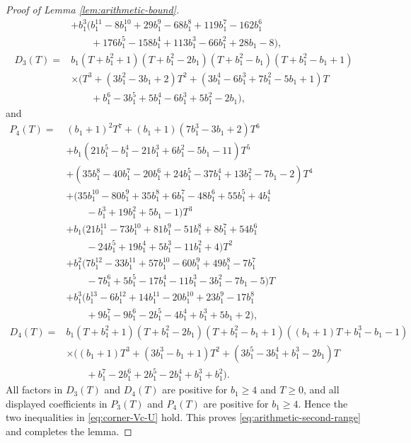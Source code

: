 \documentclass[10pt,a4paper]{amsart}
\begin{document}
\begin{proof}[Proof of Lemma \ref{lem:arithmetic-bound}]
\begin{align*}
        &+b_1^3(b_1^{11}-8b_1^{10}+29b_1^9-68b_1^8+119b_1^7-162b_1^6\\
        &\qquad +176b_1^5-158b_1^4+113b_1^3-66b_1^2+28b_1-8),\\[3pt]
D_3(T)={}&b_1(T+b_1^2+1)(T+b_1^2-2b_1)(T+b_1^2-b_1)(T+b_1^2-b_1+1)\\
        &\times\bigl(T^3+(3b_1^2-3b_1+2)T^2+(3b_1^4-6b_1^3+7b_1^2-5b_1+1)T\\
        &\qquad +b_1^6-3b_1^5+5b_1^4-6b_1^3+5b_1^2-2b_1\bigr),
\end{align*}
and
\begin{align*}
P_4(T)={}&(b_1+1)^2T^7+(b_1+1)(7b_1^3-3b_1+2)T^6\\
        &+b_1(21b_1^5-b_1^4-21b_1^3+6b_1^2-5b_1-11)T^5\\
        &+(35b_1^8-40b_1^7-20b_1^6+24b_1^5-37b_1^4+13b_1^2-7b_1-2)T^4\\
        &+(35b_1^{10}-80b_1^9+35b_1^8+6b_1^7-48b_1^6+55b_1^5+4b_1^4\\
        &\qquad -b_1^3+19b_1^2+5b_1-1)T^3\\
        &+b_1(21b_1^{11}-73b_1^{10}+81b_1^9-51b_1^8+8b_1^7+54b_1^6\\
        &\qquad -24b_1^5+19b_1^4+5b_1^3-11b_1^2+4)T^2\\
        &+b_1^2(7b_1^{12}-33b_1^{11}+57b_1^{10}-60b_1^9+49b_1^8-7b_1^7\\
        &\qquad -7b_1^6+5b_1^5-17b_1^4-11b_1^3-3b_1^2-7b_1-5)T\\
        &+b_1^3(b_1^{13}-6b_1^{12}+14b_1^{11}-20b_1^{10}+23b_1^9-17b_1^8\\
        &\qquad +9b_1^7-9b_1^6-2b_1^5-4b_1^4+b_1^3+5b_1+2),\\[3pt]
D_4(T)={}&b_1(T+b_1^2+1)(T+b_1^2-2b_1)(T+b_1^2-b_1+1)((b_1+1)T+b_1^3-b_1-1)\\
        &\times\bigl((b_1+1)T^3+(3b_1^3-b_1+1)T^2+(3b_1^5-3b_1^4+b_1^3-2b_1)T\\
        &\qquad +b_1^7-2b_1^6+2b_1^5-2b_1^4+b_1^3+b_1^2\bigr).
\end{align*}
All factors in $D_3(T)$ and $D_4(T)$ are positive for $b_1\ge4$ and $T\ge0$, and all displayed coefficients in $P_3(T)$ and $P_4(T)$ are positive for $b_1\ge4$.  Hence the two
inequalities in \eqref{eq:corner-Vc-U} hold.  This proves \eqref{eq:arithmetic-second-range} and completes the lemma.

\end{proof}
\end{document}
